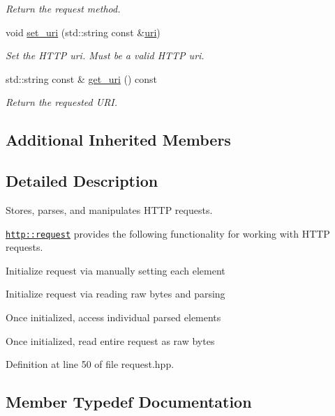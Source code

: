 \begin{DoxyCompactItemize}
\begin{DoxyCompactList}\small\item\em Return the request method. \end{DoxyCompactList}\item 
void \hyperlink{classwebsocketpp_1_1http_1_1parser_1_1request_ac4dcfa00f2112ee33b571f1754f9d893}{set\+\_\+uri} (std\+::string const \&\hyperlink{classwebsocketpp_1_1uri}{uri})
\begin{DoxyCompactList}\small\item\em Set the H\+T\+T\+P uri. Must be a valid H\+T\+T\+P uri. \end{DoxyCompactList}\item 
std\+::string const \& \hyperlink{classwebsocketpp_1_1http_1_1parser_1_1request_a24e528a52652b610e82b6e4cb921f52a}{get\+\_\+uri} () const 
\begin{DoxyCompactList}\small\item\em Return the requested U\+R\+I. \end{DoxyCompactList}\end{DoxyCompactItemize}
\subsection*{Additional Inherited Members}


\subsection{Detailed Description}
Stores, parses, and manipulates H\+T\+T\+P requests. 

\href{http::request}{\tt http\+::request} provides the following functionality for working with H\+T\+T\+P requests.


\begin{DoxyItemize}
\item Initialize request via manually setting each element
\item Initialize request via reading raw bytes and parsing
\item Once initialized, access individual parsed elements
\item Once initialized, read entire request as raw bytes 
\end{DoxyItemize}

Definition at line 50 of file request.\+hpp.



\subsection{Member Typedef Documentation}
\hypertarget{classwebsocketpp_1_1http_1_1parser_1_1request_aa9284144353524d93cedf6c053ac07cf}{}
